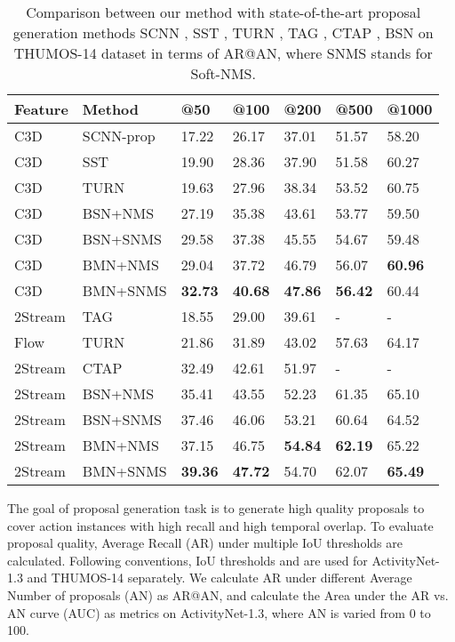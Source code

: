 \documentclass[10pt,twocolumn,letterpaper]{article}
\begin{document}
\begin{table}[tbp]
\centering
\caption{ Comparison between our method with state-of-the-art proposal generation methods SCNN  \cite{shou2016action}, SST \cite{sst_buch_cvpr17}, TURN \cite{gao2017turn}, TAG \cite{zhao2017temporal}, CTAP \cite{gao2018ctap}, BSN \cite{lin2018bsn} on  THUMOS-14 dataset in terms of AR@AN, where SNMS stands for Soft-NMS.} \small
\begin{tabular}{m{1.0cm}<{\centering}m{1.6cm}m{0.55cm}<{\centering}m{0.55cm}<{\centering}m{0.55cm}<{\centering}m{0.55cm}<{\centering}m{0.6cm}<{\centering}}
\toprule
Feature & Method  		& @50 & @100  & @200 & @500 & @1000    \\
\hline 
C3D & SCNN-prop & 17.22 & 26.17 &  37.01 & 51.57 & 58.20   \\
C3D & SST		& 19.90 & 28.36 &  37.90 & 51.58 & 60.27   \\
C3D & TURN 		& 19.63 & 27.96 &  38.34 & 53.52 & 60.75 \\
C3D & BSN+NMS 	& 27.19 & 35.38 &  43.61 &  53.77  & 59.50   \\
C3D & BSN+SNMS 	& 29.58 & 37.38 &  45.55 &  54.67  & 59.48   \\
\hline
C3D & BMN+NMS	&  29.04 &  37.72 & 46.79 & 56.07 & {\bf 60.96}  \\
C3D & BMN+SNMS 	& {\bf 32.73} & {\bf 40.68} &  {\bf 47.86} &  {\bf 56.42}  & 60.44   \\
\hline 
\hline
2Stream & TAG 	& 18.55 & 29.00  &  39.61 & - & -  \\
Flow & TURN		& 21.86 & 31.89 & 43.02 & 57.63  & 64.17  \\
2Stream & CTAP  & 32.49 & 42.61 & 51.97 & -  & -  \\
2Stream & BSN+NMS & 	 35.41 & 43.55 &  52.23 &  61.35 & 65.10  \\
2Stream & BSN+SNMS & 	 37.46 & 46.06 &  53.21 & 60.64 & 64.52 \\
\hline
2Stream & BMN+NMS & 	37.15 & 46.75 &  {\bf 54.84} & {\bf 62.19} & 65.22 \\
2Stream & BMN+SNMS & {\bf 39.36} & {\bf 47.72} &  54.70 &  62.07 & {\bf 65.49}  \\
\bottomrule
\end{tabular}
\label{table:proposal_thumos}
\vspace{-0.1cm}
\end{table}



The goal of proposal generation task is to generate high quality proposals to cover  action instances with high recall and high temporal overlap. 
To evaluate proposal quality, Average Recall (AR) under multiple IoU thresholds are calculated. Following   conventions,  IoU thresholds  and  are used for ActivityNet-1.3 and  THUMOS-14 separately. 
We calculate AR under different Average Number of proposals (AN) as AR@AN, and calculate the Area under the AR vs. AN curve (AUC) as metrics on ActivityNet-1.3, where AN is varied from 0 to 100.
\end{document}
